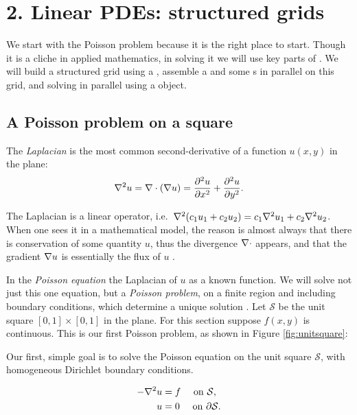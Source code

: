 
\chapter{2. Linear PDEs: structured grids}

We start with the Poisson problem because it is the right place to start.  Though it is a cliche in applied mathematics, in solving it we will use key parts of \PETSc.  We will build a structured grid using a \PETSc \pDMDA, assemble a \pMat and some \pVec s in parallel on this grid, and solving in parallel using a \pKSP object.

\section{A Poisson problem on a square}

The \emph{Laplacian} is the most common second-derivative of a function $u(x,y)$ in the plane:
    $$\nabla^2 u = \nabla\cdot(\nabla u) = \frac{\partial^2 u}{\partial x^2} + \frac{\partial^2 u}{\partial y^2}.$$

The Laplacian is a linear operator, i.e.~$\nabla^2(c_1 u_1 + c_2 u_2) = c_1 \nabla^2 u_1 + c_2 \nabla^2 u_2$.  When one sees it in a mathematical model, the reason is almost always that there is conservation of some quantity $u$, thus the divergence $\nabla\cdot$ appears, and that the gradient $\nabla u$ is essentially the flux of $u$ \citep{Ockendonetal2003}.  

In the \emph{Poisson equation} the Laplacian of $u$ as a known function.  We will solve not just this one equation, but a \emph{Poisson problem}, on a finite region and including boundary conditions, which determine a unique solution \citep{Evans}.  Let $\mathcal{S}$ be the unit square $[0,1]\times[0,1]$ in the plane.  For this section suppose $f(x,y)$ is continuous.   This is our first Poisson problem, as shown in Figure \ref{fig:unitsquare}:
\begin{marginfigure}
\caption{Our first, simple goal is to solve the Poisson equation on the unit square $\mathcal{S}$, with homogeneous Dirichlet boundary conditions.}
\label{fig:unitsquare}
\end{marginfigure}
\begin{align}
- \nabla^2 u &= f \quad \text{ on } \mathcal{S}, \label{poissonsquare} \\
u &= 0 \quad \text{ on } \partial \mathcal{S}. \notag
\end{align}

